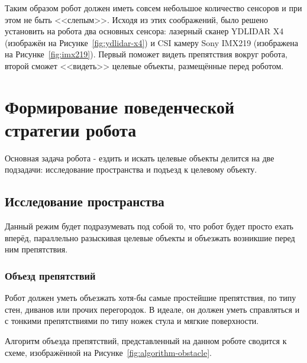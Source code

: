 Таким образом робот должен иметь совсем небольшое количество сенсоров и при этом не быть <<слепым>>. Исходя из этих соображений, было решено установить на робота два основных сенсора: лазерный сканер YDLIDAR X4 (изображён на Рисунке~\ref{fig:ydlidar-x4}) и CSI камеру Sony IMX219 (изображена на Рисунке~\ref{fig:imx219}). Первый поможет видеть препятствия вокруг робота, второй сможет <<видеть>> целевые объекты, размещённые перед роботом. 

\begin{figure}[ht]
\end{figure}


\section{Формирование поведенческой стратегии робота}

Основная задача робота - ездить и искать целевые объекты делится на две подзадачи: исследование пространства и подъезд к целевому объекту.

\subsection{Исследование пространства}

Данный режим будет подразумевать под собой то, что робот будет просто ехать вперёд, параллельно разыскивая целевые объекты и объезжать возникшие перед ним препятствия. 

\subsubsection{Объезд препятствий}

Робот должен уметь объезжать хотя-бы самые простейшие препятствия, по типу стен, диванов или прочих перегородок. В идеале, он должен уметь справляться и с тонкими препятствиями по типу ножек стула и мягкие поверхности.

Алгоритм объезда препятствий, представленный на данном роботе сводится к схеме, изображённой на Рисунке~\ref{fig:algorithm-obstacle}.


